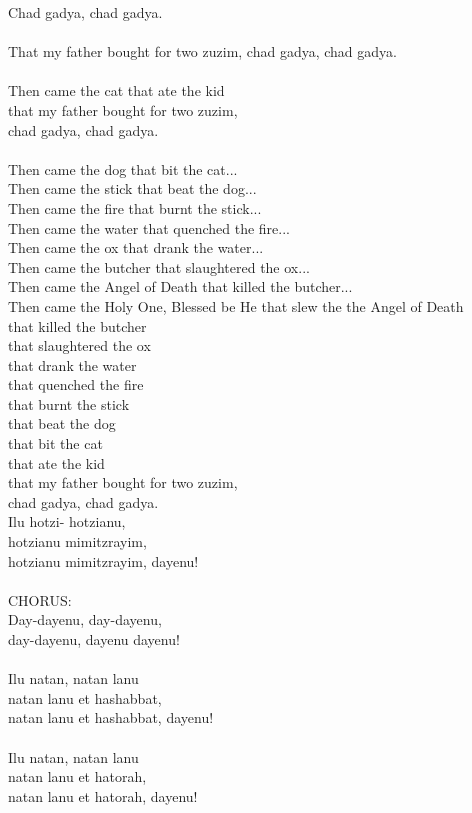 \documentclass[twoside,14pt,openany,letterpaper]{memoir}%
\begin{document}
Chad gadya, chad gadya.\\
\\
That my father bought for two zuzim, chad gadya, chad gadya.\\
\\
Then came the cat that ate the kid\\
that my father bought for two zuzim,\\
chad gadya, chad gadya.\\
\\
Then came the dog that bit the cat...\\
Then came the stick that beat the dog...\\
Then came the fire that burnt the stick...\\
Then came the water that quenched the fire...\\
Then came the ox that drank the water...\\
Then came the butcher that slaughtered the ox...\\
Then came the Angel of Death that killed the butcher...\\
Then came the Holy One, Blessed be He that slew the the Angel of Death\\
\indent that killed the butcher\\
\indent that slaughtered the ox\\
\indent that drank the water\\
\indent that quenched the fire\\
\indent that burnt the stick\\
\indent that beat the dog\\
\indent that bit the cat\\
\indent that ate the kid\\
\indent that my father bought for two zuzim,\\
\indent chad gadya, chad gadya.\\

Ilu hotzi- hotzianu,\\
hotzianu mimitzrayim,\\
hotzianu mimitzrayim, dayenu!\\
\\
\footnotesize{CHORUS:}\normalsize\\
Day-dayenu, day-dayenu,\\
day-dayenu, dayenu dayenu!\\
\\
Ilu natan, natan lanu\\
natan lanu et hashabbat,\\
natan lanu et hashabbat, dayenu!\\
\\
Ilu natan, natan lanu\\
natan lanu et hatorah,\\
natan lanu et hatorah, dayenu!\\
\end{document}
